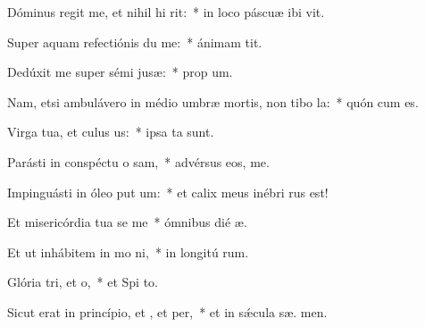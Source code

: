 \item Dóminus regit me, et nihil hi rit:~* in loco páscuæ ibi  vit.
\item Super aquam refectiónis du me:~* ánimam  tit.
\item Dedúxit me super sémi jusæ:~* prop  um.
\item Nam, etsi ambulávero in médio umbræ mortis, non tibo la:~* quón  cum es.
\item Virga tua, et culus us:~* ipsa  ta sunt.
\item Parásti in conspéctu o sam,~* advérsus eos,   me.
\item Impinguásti in óleo put um:~* et calix meus inébri  rus est!
\item Et misericórdia tua se me~* ómnibus dié  æ.
\item Et ut inhábitem in mo ni,~* in longitú rum.
\item Glória tri, et o,~* et Spi to.
\item Sicut erat in princípio, et , et per,~* et in sǽcula sæ. men.
